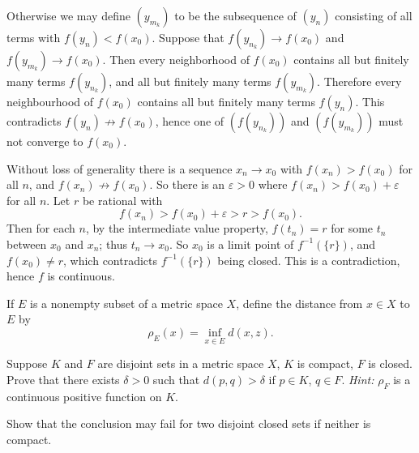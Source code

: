 \begin{questions}
\begin{solution}
    Otherwise we may define $(y_{m_k})$ to be the subsequence of $(y_n)$ consisting of all terms with $f(y_n)<f(x_0)$. Suppose that $f(y_{n_k})\to f(x_0)$ and $f(y_{m_k})\to f(x_0)$. Then every neighborhood of $f(x_0)$ contains all but finitely many terms $f(y_{n_k})$, and all but finitely many terms $f(y_{m_k})$. Therefore every neighbourhood of $f(x_0)$ contains all but finitely many terms $f(y_n)$. This contradicts $f(y_n)\not\to f(x_0)$, hence one of $(f(y_{n_k}))$ and $(f(y_{m_k}))$ must not converge to $f(x_0)$.

    Without loss of generality there is a sequence $x_n\to x_0$ with $f(x_n)>f(x_0)$ for all $n$, and $f(x_n)\not\to f(x_0)$. So there is an $\varepsilon>0$ where $f(x_n)>f(x_0)+\varepsilon$ for all $n$. Let $r$ be rational with
    \[ f(x_n) > f(x_0) + \varepsilon > r > f(x_0). \]
    Then for each $n$, by the intermediate value property, $f(t_n)=r$ for some $t_n$ between $x_0$ and $x_n$; thus $t_n\to x_0$. So $x_0$ is a limit point of $f^{-1}(\{r\})$, and $f(x_0)\neq r$, which contradicts $f^{-1}(\{r\})$ being closed. This is a contradiction, hence $f$ is continuous.
  \end{solution}

  \question If $E$ is a nonempty subset of a metric space $X$, define the distance from $x\in X$ to $E$ by
  \[ \rho_E(x) = \inf_{x\in E} d(x,z). \]

  \question Suppose $K$ and $F$ are disjoint sets in a metric space $X$, $K$ is compact, $F$ is closed. Prove that there exists $\delta>0$ such that $d(p,q)>\delta$ if $p\in K$, $q\in F$. \emph{Hint:} $\rho_F$ is a continuous positive function on $K$.

  Show that the conclusion may fail for two disjoint closed sets if neither is compact.


\end{questions}
